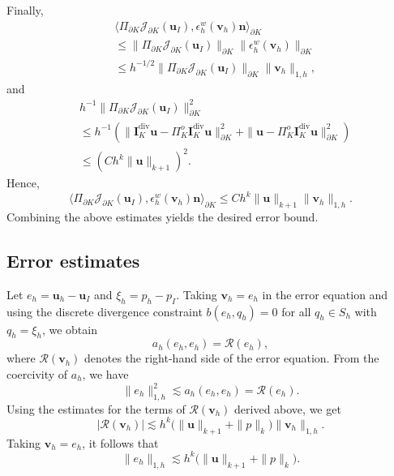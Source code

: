\documentclass[review,hidelinks,onefignum,onetabnum]{siamart251216}
\begin{document}
Finally,
\begin{align*}
& \langle \Pi_{\partial K} \mathcal{J}_{\partial K}(\boldsymbol{u}_I), \epsilon_h^w(\boldsymbol{v}_h)\boldsymbol{n} \rangle_{\partial K} \\
&\le \| \Pi_{\partial K} \mathcal{J}_{\partial K}(\boldsymbol{u}_I) \|_{\partial K} 
   \| \epsilon_h^w(\boldsymbol{v}_h) \|_{\partial K} \\
&\le h^{-1/2} \| \Pi_{\partial K} \mathcal{J}_{\partial K}(\boldsymbol{u}_I) \|_{\partial K} 
   \| \boldsymbol{v}_h \|_{1,h},
\end{align*}
and
\begin{align*}
& h^{-1} \| \Pi_{\partial K} \mathcal{J}_{\partial K}(\boldsymbol{u}_I) \|_{\partial K}^2 \\
&\leq h^{-1} \left( \| \boldsymbol{I}_K^{\operatorname{div}} \boldsymbol{u} - \Pi_K^o \boldsymbol{I}_K^{\operatorname{div}} \boldsymbol{u} \|_{\partial K}^2 
   + \| \boldsymbol{u} - \Pi_K^o \boldsymbol{I}_K^{\operatorname{div}} \boldsymbol{u} \|_{\partial K}^2 \right) \\
&\le \left( C h^k \|\boldsymbol{u}\|_{k+1} \right)^2.
\end{align*}
Hence,
\[
\langle \Pi_{\partial K} \mathcal{J}_{\partial K}(\boldsymbol{u}_I), \epsilon_h^w(\boldsymbol{v}_h)\boldsymbol{n} \rangle_{\partial K}
\le C h^k \|\boldsymbol{u}\|_{k+1} \| \boldsymbol{v}_h \|_{1,h}.
\]
Combining the above estimates yields the desired error bound.

\subsection{Error estimates}
Let \(e_h = \boldsymbol{u}_h - \boldsymbol{u}_I\) and \(\xi_h = p_h - p_I\). 
Taking \(\boldsymbol{v}_h = e_h\) in the error equation and using the discrete divergence constraint 
\(b(e_h, q_h)=0\) for all \(q_h\in S_h\) with \(q_h=\xi_h\), we obtain
\[
a_h(e_h, e_h) = \mathcal{R}(e_h),
\]
where \(\mathcal{R}(\boldsymbol{v}_h)\) denotes the right-hand side of the error equation. 
From the coercivity of \(a_h\), we have
\[
\|e_h\|_{1,h}^2 \lesssim a_h(e_h, e_h) = \mathcal{R}(e_h).
\]
Using the estimates for the terms of \(\mathcal{R}(\boldsymbol{v}_h)\) derived above, we get
\[
|\mathcal{R}(\boldsymbol{v}_h)| \lesssim h^k \bigl(\|\boldsymbol{u}\|_{k+1} + \|p\|_k\bigr) \|\boldsymbol{v}_h\|_{1,h}.
\]
Taking \(\boldsymbol{v}_h = e_h\), it follows that
\[
\|e_h\|_{1,h} \lesssim h^k \bigl(\|\boldsymbol{u}\|_{k+1} + \|p\|_k\bigr).
\]
\end{document}
